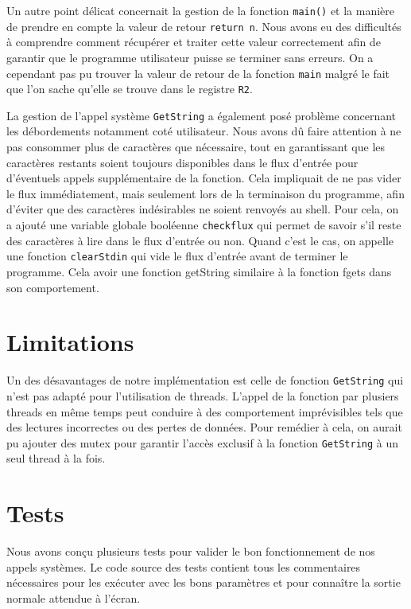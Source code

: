 \documentclass[a4paper,11pt]{article}
\begin{document}
Un autre point délicat concernait la gestion de la fonction \texttt{main()} et la manière de prendre en compte la valeur de retour \texttt{return n}. 
Nous avons eu des difficultés à comprendre comment récupérer et traiter cette valeur correctement afin de garantir que le programme utilisateur puisse se terminer sans erreurs. 
On a cependant pas pu trouver la valeur de retour de la fonction \texttt{main} malgré le fait que l'on sache qu'elle se trouve dans le registre \texttt{R2}.

La gestion de l'appel système \texttt{GetString} a également posé problème concernant les débordements notamment coté utilisateur. Nous avons dû faire attention à ne pas consommer plus de caractères que nécessaire, 
tout en garantissant que les caractères restants soient toujours disponibles dans le flux d'entrée pour d'éventuels appels supplémentaire de la fonction. Cela impliquait de ne pas vider le flux immédiatement, 
mais seulement lors de la terminaison du programme, afin d'éviter que des caractères indésirables ne soient renvoyés au shell. 
Pour cela, on a ajouté une variable globale booléenne \texttt{checkflux} qui permet de savoir s'il reste des caractères à lire dans le flux d'entrée ou non. 
Quand c'est le cas, on appelle une fonction \texttt{clearStdin} qui vide le flux d'entrée avant de terminer le programme.
Cela avoir une fonction getString similaire à la fonction fgets dans son comportement.



\section{Limitations}

Un des désavantages de notre implémentation est celle de fonction \texttt{GetString} qui n'est pas adapté pour l'utilisation de threads. 
L'appel de la fonction par plusiers threads en même temps peut conduire à des comportement imprévisibles tels que des lectures incorrectes ou des pertes de données.
Pour remédier à cela, on aurait pu ajouter des mutex pour garantir l'accès exclusif à la fonction \texttt{GetString} à un seul thread à la fois.

\section{Tests}

Nous avons conçu plusieurs tests pour valider le bon fonctionnement de nos appels systèmes.
Le code source des tests contient tous les commentaires nécessaires pour les exécuter avec les bons paramètres et pour connaître la sortie normale attendue à l'écran.
\end{document}
